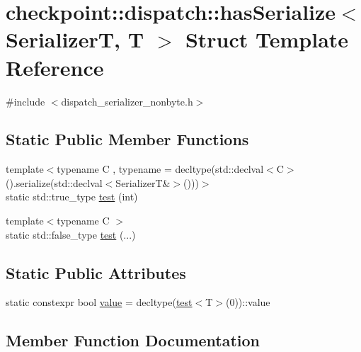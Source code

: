 \hypertarget{structcheckpoint_1_1dispatch_1_1has_serialize}{}\section{checkpoint\+:\+:dispatch\+:\+:has\+Serialize$<$ SerializerT, T $>$ Struct Template Reference}
\label{structcheckpoint_1_1dispatch_1_1has_serialize}


{\ttfamily \#include $<$dispatch\+\_\+serializer\+\_\+nonbyte.\+h$>$}

\subsection*{Static Public Member Functions}
\begin{DoxyCompactItemize}
\item 
{\footnotesize template$<$typename C , typename  = decltype(std\+::declval$<$\+C$>$().\+serialize(std\+::declval$<$\+Serializer\+T\&$>$()))$>$ }\\static std\+::true\+\_\+type \hyperlink{structcheckpoint_1_1dispatch_1_1has_serialize_a615e980a87e3fca303990537a575a62b}{test} (int)
\item 
{\footnotesize template$<$typename C $>$ }\\static std\+::false\+\_\+type \hyperlink{structcheckpoint_1_1dispatch_1_1has_serialize_ae7f501196169c72e131833398885f8db}{test} (...)
\end{DoxyCompactItemize}
\subsection*{Static Public Attributes}
\begin{DoxyCompactItemize}
\item 
static constexpr bool \hyperlink{structcheckpoint_1_1dispatch_1_1has_serialize_abebe1928949685ab9a4e3cab386968bc}{value} = decltype(\hyperlink{structcheckpoint_1_1dispatch_1_1has_serialize_a615e980a87e3fca303990537a575a62b}{test}$<$T$>$(0))\+::value
\end{DoxyCompactItemize}


\subsection{Member Function Documentation}
\mbox{\label{structcheckpoint_1_1dispatch_1_1has_serialize_a615e980a87e3fca303990537a575a62b}} 
